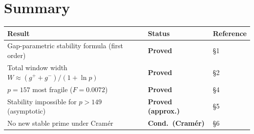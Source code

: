\documentclass[11pt,a4paper]{article}
\begin{document}
\section{Summary}

\begin{center}
\begin{tabular}{lll}
\hline
Result & Status & Reference \\
\hline
Gap-parametric stability formula (first order) & \textbf{Proved} & §1 \\
Total window width $W \approx (g^++g^-)/(1+\ln p)$ & \textbf{Proved} & §2 \\
$p=157$ most fragile ($F = 0.0072$) & \textbf{Proved} & §4 \\
Stability impossible for $p > 149$ (asymptotic) & \textbf{Proved (approx.)} & §5 \\
No new stable prime under Cram\'er & \textbf{Cond.\ (Cram\'er)} & §6 \\
\hline
\end{tabular}
\end{center}
\end{document}
